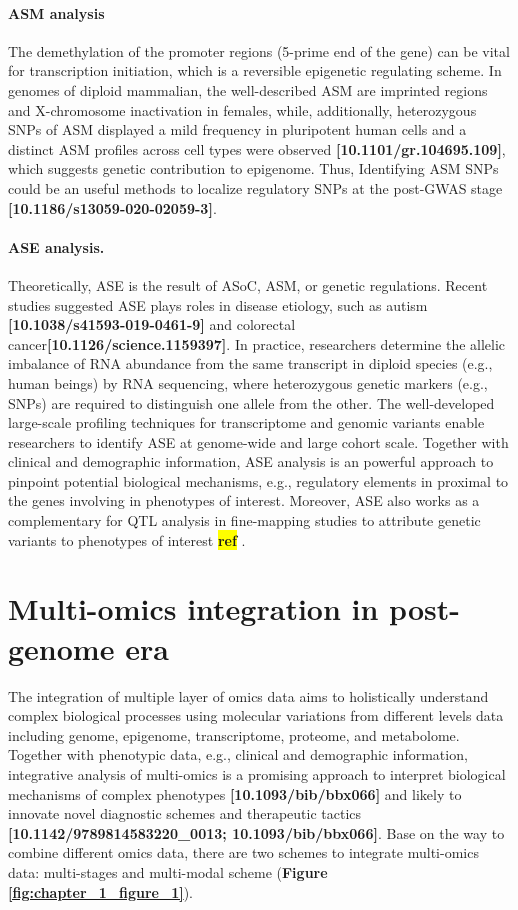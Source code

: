 \documentclass[12pt,usletter,fancy]{elegantbook}
\newcommand{\reqref}[1][ref]{
  \colorbox{yellow}{\textbf{#1}}
}
\begin{document}
\paragraph*{ASM analysis}
The demethylation of the promoter regions (5-prime end of the gene) can be vital for transcription initiation, which is a reversible epigenetic regulating scheme.
In genomes of diploid mammalian, the well-described ASM are imprinted regions and X-chromosome inactivation in females, while, additionally, heterozygous SNPs of ASM displayed a mild frequency in pluripotent human cells and a distinct ASM profiles across cell types were observed \textbf{[10.1101/gr.104695.109]}, which suggests genetic contribution to epigenome.
Thus, Identifying ASM SNPs could be an useful methods to localize regulatory SNPs at the post-GWAS stage \textbf{[10.1186/s13059-020-02059-3]}.

\paragraph*{ASE analysis.}
Theoretically, ASE is the result of ASoC, ASM, or genetic regulations.
Recent studies suggested ASE plays roles in disease etiology, such as autism \textbf{[10.1038/s41593-019-0461-9]} and colorectal cancer\textbf{[10.1126/science.1159397]}.
In practice, researchers determine the allelic imbalance of RNA abundance from the same transcript in diploid species (e.g., human beings) by RNA sequencing, where heterozygous genetic markers (e.g., SNPs) are required to distinguish one allele from the other.
The well-developed large-scale profiling techniques for transcriptome and genomic variants enable researchers to identify ASE at genome-wide and large cohort scale.
Together with clinical and demographic information, ASE analysis is an powerful approach to pinpoint potential biological mechanisms, e.g., regulatory elements in proximal to the genes involving in phenotypes of interest.
Moreover, ASE also works as a complementary for QTL analysis in fine-mapping studies to attribute genetic variants to phenotypes of interest\reqref.

\section*{Multi-omics integration in post-genome era}
The integration of multiple layer of omics data aims to holistically understand complex biological processes using molecular variations from different levels data including genome, epigenome, transcriptome, proteome, and metabolome.
Together with phenotypic data, e.g., clinical and demographic information, integrative analysis of multi-omics is a promising approach to interpret biological mechanisms of complex phenotypes \textbf{[10.1093/bib/bbx066]} and likely to innovate novel diagnostic schemes and therapeutic tactics \textbf{[10.1142/9789814583220\_0013; 10.1093/bib/bbx066]}.
Base on the way to combine different omics data, there are two schemes to integrate multi-omics data: multi-stages and multi-modal scheme (\textbf{Figure \ref{fig:chapter_1_figure_1}}).
\end{document}

